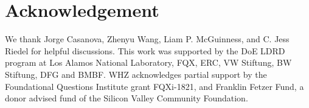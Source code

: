 \documentclass[aps,prl,floatfix,twocolumn,footinbib,superscriptaddress]{revtex4-1}
\begin{document}
\section*{\label{sec:Acknowledgement} Acknowledgement}
We thank Jorge Casanova, Zhenyu Wang, Liam P. McGuinness, and C. Jess Riedel for helpful discussions. This work was supported by the DoE LDRD program at Los Alamos National Laboratory, FQX, ERC, VW Stiftung, BW Stiftung, DFG and BMBF.  WHZ acknowledges partial support by the Foundational Questions Institute grant FQXi-1821, and Franklin Fetzer Fund, a donor advised fund of the Silicon Valley Community Foundation. 



\end{document}
